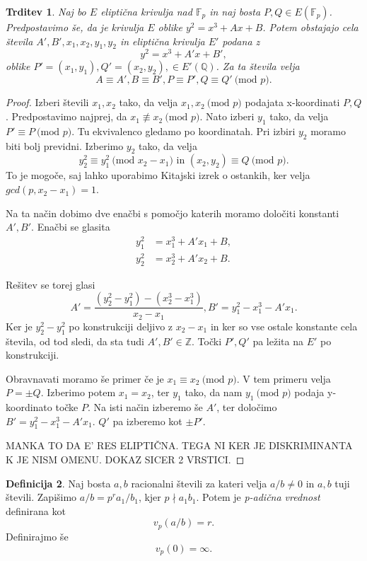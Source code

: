 \documentclass[12pt,a4paper,twoside]{article}
\theoremstyle{definition} %
\newtheorem{definicija}{Definicija}[section]
\theoremstyle{plain} %
\newtheorem{trditev}[definicija]{Trditev}
\numberwithin{equation}{section}  %
\newcommand{\Z}{\mathbb Z}
\newcommand{\Q}{\mathbb Q}
\newcommand{\F}{\mathbb F}
\newcommand{\E}[1]{E({#1})}
\newcommand{\MOD}[1]{\ \text{(mod }{#1}\text{)}}
\begin{document}
\begin{trditev}
\label{trd:5.6}
Naj bo $E$ eliptična krivulja nad $\F_p$ in naj bosta $P,Q \in \E{\F_p}$. Predpostavimo še, da je krivulja $E$ oblike $y^2=x^3+Ax+B$. Potem obstajajo cela števila
$A',B',x_1,x_2,y_1,y_2$ in eliptična krivulja $E'$ podana z
$$y^2=x^3+A'x+B',$$
oblike $P'=(x_1,y_1),Q'=(x_2,y_2), \in E'(\Q)$.
Za ta števila velja
$$A\equiv A',B \equiv B', P \equiv P', Q \equiv Q' \MOD{p}.$$

\end{trditev}

\begin{proof}

Izberi števili $x_1,x_2$ tako, da velja $x_1,x_2 \MOD{p}$ podajata x-koordinati $P,Q$. Predpostavimo najprej, da $x_1 \not \equiv x_2 \MOD{p}$. Nato izberi $y_1$ tako, da velja
$P' \equiv P \MOD{p}$. Tu ekvivalenco gledamo po koordinatah. Pri izbiri $y_2$ moramo biti bolj previdni. Izberimo $y_2$ tako, da velja
$$y_2^2\equiv y_1^2 \MOD{x_2-x_1} \text{ in } (x_2,y_2) \equiv Q \MOD{p}.$$
To je mogoče, saj lahko uporabimo Kitajski izrek o ostankih, ker velja $gcd(p,x_2-x_1) = 1$.

Na ta način dobimo dve enačbi s pomočjo katerih moramo določiti konstanti $A',B'$.
Enačbi se glasita
\begin{align}
y_1^2&{}=x_1^3+A'x_1+B, \nonumber  \\
y_2^2&{}=x_2^3+A'x_2+B. \nonumber
\end{align}

Rešitev se torej glasi
$$A' = \frac{(y_2^2-y_1^2)-(x_2^3-x_1^3)}{x_2-x_1}, B' = y_1^2-x_1^3-A'x_1.$$
Ker je $y_2^2-y_1^2$ po konstrukciji deljivo z $x_2-x_1$ in ker so vse ostale konstante cela števila, od tod sledi, da sta tudi $A',B' \in \Z$. Točki $P',Q'$ pa ležita na $E'$ po konstrukciji.

Obravnavati moramo še primer če je $x_1 \equiv x_2 \MOD{p}$. V tem primeru velja $P = \pm Q$. Izberimo potem $x_1 = x_2$, ter $y_1$ tako, da nam $y_1 \MOD{p}$ podaja y-koordinato točke $P$. Na isti način izberemo še $A'$, ter določimo $B' = y_1^2-x_1^3-A'x_1$. $Q'$ pa izberemo kot $\pm P'$.

MANKA TO DA E' RES ELIPTIČNA. TEGA NI KER JE DISKRIMINANTA K JE NISM OMENU. DOKAZ SICER 2 VRSTICI.
\end{proof}


\begin{definicija}

Naj bosta $a,b$ racionalni števili za kateri velja $a/b \neq 0$ in $a,b$ tuji števili. Zapišimo $a/b = p^ra_1/b_1$, kjer $p \nmid a_1b_1$. Potem je \emph{p-adična vrednost} definirana
kot
$$v_p(a/b) = r.$$
Definirajmo še
$$v_p(0) = \infty.$$
\end{definicija}
\end{document}
